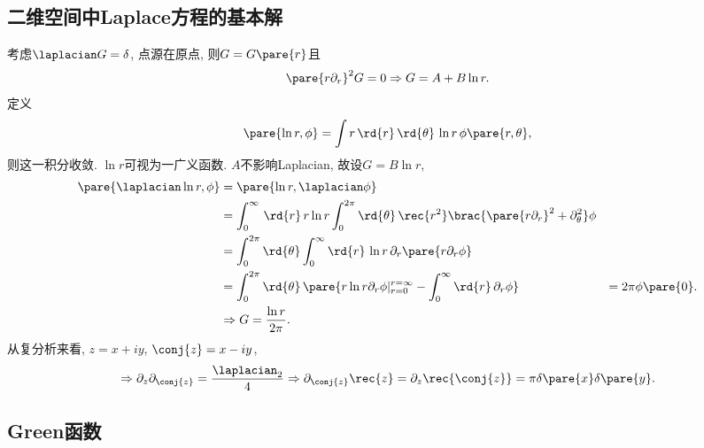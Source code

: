 \documentclass[hidelinks]{ctexart}
\begin{document}

\subsection{二维空间中Laplace方程的基本解} %
\label{sub:二维空间中laplace方程的基本解}

\newpoint{}考虑$\laplacian G = \delta$, 点源在原点, 则$G=G\pare{r}$且
\[ \pare{r\partial_r}^2 G = 0 \Rightarrow G = A + B \ln r. \]
\newpoint{}定义
\[ \pare{\ln r,\phi} = \int r\,\rd{r}\,\rd{\theta}\,\ln r\, \phi\pare{r,\theta}, \]
则这一积分收敛. $\ln r$可视为一广义函数.
\newpoint{}$A$不影响Laplacian, 故设$G = B\ln r$,
\begin{align*}
    \pare{\laplacian \ln r,\phi} &= \pare{\ln r,\laplacian \phi} \\
    &= \int_0^\infty\,\rd{r}\, r\ln r \int_0^{2\pi} \rd{\theta}\, \rec{r^2}\brac{\pare{r\partial_r}^2 + \partial_\theta^2}\phi \\
    &= \int_0^{2\pi} \rd{\theta}\int_0^\infty\rd{r}\,\ln r \,\partial_r\pare{r\partial_r \phi} \\
    &= \int_0^{2\pi} \rd{\theta}\,\pare{r\ln r\partial_r\phi \vert_{r=0}^{r=\infty} - \int_0^\infty\rd{r}\,\partial_r\phi}
    &= 2\pi\phi\pare{0}. \\
    &\Rightarrow G = \frac{\ln r}{2\pi}.
\end{align*}
\newpoint{}从复分析来看, $z = x+iy$, $\conj{z} = x-iy$,
\[ \Rightarrow \partial_z \partial_{\conj{z}} = \frac{\laplacian_2}{4} \Rightarrow \partial_{\conj{z}} \rec{z} = \partial_z \rec{\conj{z}} = \pi\delta\pare{x}\delta\pare{y}. \]


\subsection{Green函数} %
\label{sub:green函数}
\end{document}
